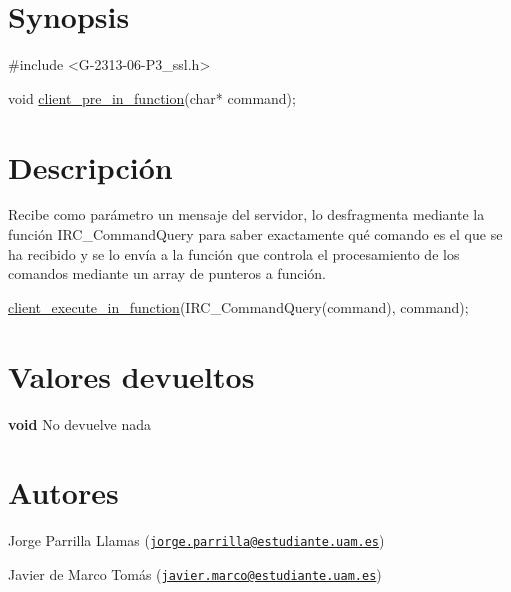 \hypertarget{client_pre_in_function_synopsis_3}{}\section{Synopsis}\label{client_pre_in_function_synopsis_3}

\begin{DoxyCode}
\textcolor{preprocessor}{#include <G-2313-06-P3\_ssl.h>}

\textcolor{keywordtype}{void} \hyperlink{G-2313-06-P2__client_8h_aa74c686c447b275e6a8cf36419033e81}{client\_pre\_in\_function}(\textcolor{keywordtype}{char}* command);
\end{DoxyCode}
 \hypertarget{client_pre_in_function_descripcion_3}{}\section{Descripción}\label{client_pre_in_function_descripcion_3}
Recibe como parámetro un mensaje del servidor, lo desfragmenta mediante la función I\+R\+C\+\_\+\+Command\+Query para saber exactamente qué comando es el que se ha recibido y se lo envía a la función que controla el procesamiento de los comandos mediante un array de punteros a función. 
\begin{DoxyCode}
\hyperlink{G-2313-06-P2__client_8h_a6dd72e0b56b87f85d8cac2a30066198b}{client\_execute\_in\_function}(IRC\_CommandQuery(command), command);
\end{DoxyCode}
\hypertarget{client_pre_in_function_return_3}{}\section{Valores devueltos}\label{client_pre_in_function_return_3}

\begin{DoxyItemize}
\item {\bfseries void} No devuelve nada 
\end{DoxyItemize}\hypertarget{client_pre_in_function_authors_3}{}\section{Autores}\label{client_pre_in_function_authors_3}

\begin{DoxyItemize}
\item Jorge Parrilla Llamas (\href{mailto:jorge.parrilla@estudiante.uam.es}{\tt jorge.\+parrilla@estudiante.\+uam.\+es}) 
\item Javier de Marco Tomás (\href{mailto:javier.marco@estudiante.uam.es}{\tt javier.\+marco@estudiante.\+uam.\+es}) 
\end{DoxyItemize}